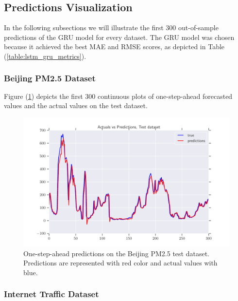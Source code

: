 \documentclass[a4paper, 12pt]{article}
\numberwithin{equation}{section}
\numberwithin{figure}{section}
\numberwithin{table}{section}
\begin{document}
	\newpage
	
	\subsection{Predictions Visualization}
	
	In the following subsections we will illustrate the first 300 out-of-sample predictions of the GRU model for every dataset. The GRU model was chosen because it achieved the best MAE and RMSE scores, as depicted in Table (\ref{table:lstm_gru_metrics}).
	
	\subsubsection{Beijing PM2.5 Dataset}
	
	Figure (\ref{fig:beijing_test_preds}) depicts the first 300 continuous plots of one-step-ahead forecasted values and the actual values on the test dataset.
	
	\begin{figure}[H]
		\centering
		\includegraphics[width=\textwidth, height=\textheight, keepaspectratio]{plots/beijing/beijing_300_test_preds.pdf}
		\caption[Out-of-sample one-step-ahead forecasts on the Beijing PM2.5 dataset]{One-step-ahead predictions on the Beijing PM2.5 test dataset. Predictions are represented with red color and actual values with blue.}
		\label{fig:beijing_test_preds}
	\end{figure}
	
	\newpage
	
	\subsubsection{Internet Traffic Dataset}
	
\end{document}
